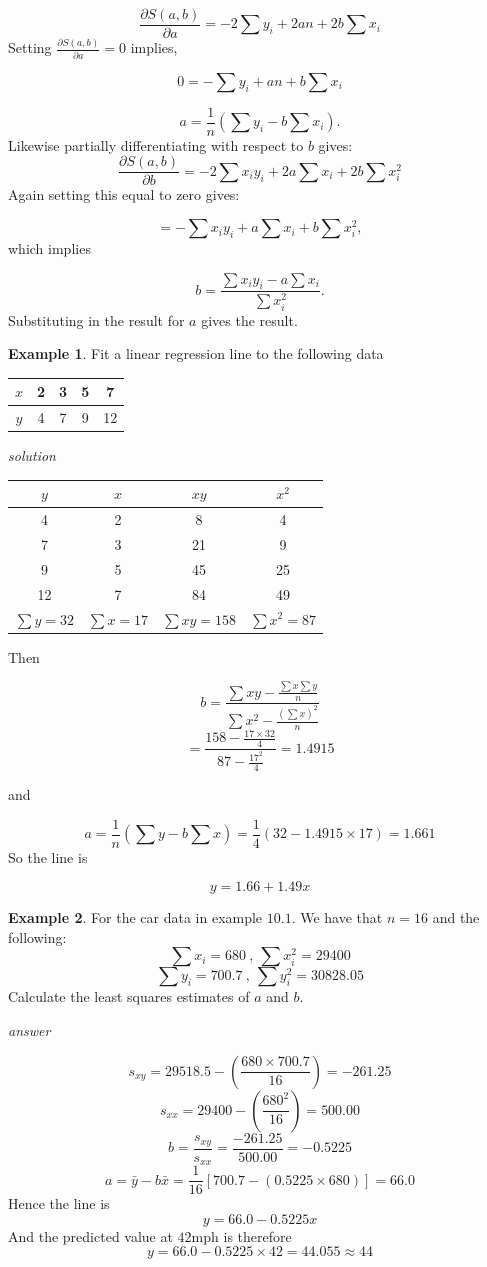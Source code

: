 \documentclass[
]{book}
\theoremstyle{definition}
\theoremstyle{definition}
\newtheorem{example}{Example}[chapter]
\theoremstyle{definition}
\theoremstyle{definition}
\theoremstyle{remark}
\begin{document}
\[\frac{\partial S(a,b)}{\partial a} =-2\sum y_i+ 2an +2b\sum x_i\]
Setting \(\frac{\partial S(a,b)}{\partial a}=0\) implies,

\[0=-\sum y_i+ an +b\sum x_i \]

\[a= \frac{1}{n}\left(\sum y_i - b \sum x_i\right).\]
Likewise partially differentiating with respect to \(b\) gives:
\[ \frac{\partial S(a,b)}{\partial b} = -2\sum x_i y_i+2a\sum x_i + 2b\sum x_i^2\]
Again setting this equal to zero gives:

\[= -\sum x_i y_i+a\sum x_i + b\sum x_i^2 ,\]
which implies

\[b = \frac{\sum x_iy_i - a\sum x_i}{\sum x_i^2}.\]
Substituting in the result for \(a\) gives the result.

\begin{example}
Fit a linear regression line to the following data

\begin{longtable}[]{@{}ccccc@{}}
\toprule
\(x\) & 2 & 3 & 5 & 7\tabularnewline
\midrule
\endhead
\(y\) & 4 & 7 & 9 & 12\tabularnewline
\bottomrule
\end{longtable}

\emph{solution}

\begin{longtable}[]{@{}cccc@{}}
\toprule
\(y\) & \(x\) & \(xy\) & \(x^2\)\tabularnewline
\midrule
\endhead
4 & 2 & 8 & 4\tabularnewline
7 & 3 & 21 & 9\tabularnewline
9 & 5 & 45 & 25\tabularnewline
12 & 7 & 84 & 49\tabularnewline
\(\sum y =32\) & \(\sum x = 17\) & \(\sum xy = 158\) & \(\sum x^2 = 87\)\tabularnewline
\bottomrule
\end{longtable}

Then

\[b = \frac{\sum xy - \frac{\sum x \sum y}{n}}{\sum x^2 - \frac{(\sum x)^2}{n}} \]
\[=\frac{158 - \frac{17\times32}{4}}{87 - \frac{17^2}{4}} =1.4915\]

and

\[a = \frac{1}{n}(\sum y -b \sum x) =\frac{1}{4}(32 - 1.4915\times 17) = 1.661\]
So the line is

\[y = 1.66 + 1.49x\]
\end{example}

\begin{example}
For the car data in example \(10.1\). We have that \(n=16\) and the following:
\[\sum x_i = 680 \ , \ \sum x_i^2 = 29400\]
\[\sum y_i = 700.7 \ , \ \sum y_i^2 = 30828.05\]
Calculate the least squares estimates of \(a\) and \(b\).

\emph{answer}

\[s_{xy} = 29518.5 - \left(\frac{680\times700.7}{16}\right) = -261.25\]
\[s_{xx} = 29400 - \left(\frac{680^2}{16}\right) = 500.00\]
\[b = \frac{s_{xy}}{s_{xx}} = \frac{-261.25}{500.00}= -0.5225\]
\[a= \bar{y}-b\bar{x}=\frac{1}{16}[700.7 - (0.5225\times680)]= 66.0\]
Hence the line is
\[y = 66.0 -0.5225x\]
And the predicted value at \(42\)mph is therefore
\[y = 66.0 -0.5225\times 42 = 44.055\approx 44\]
\end{example}
\end{document}
